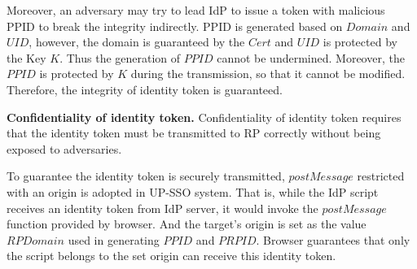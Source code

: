 Moreover, 
an adversary may try to lead IdP to issue a token with malicious PPID to break the integrity indirectly.  PPID is generated based on $Domain$ and $UID$, however, the domain is guaranteed by the $Cert$ and $UID$ is protected by the Key $K$. Thus the generation of $PPID$ cannot be undermined. Moreover, the $PPID$ is protected by $K$ during the transmission, so that it cannot be modified. Therefore, the integrity of identity token is guaranteed. 
\begin{comment}
\item An adversary may attempt to temper the $PPID$ while it is transmitted between enclave application and IdP server. However, $PPID$ is encrypted (step 17) and the key is only known to enclave application and IdP server (key exchange at step 10).
\item The adversary may also try to undermine the generation of $PPID$. 
The $PPID$ is generated based on $RPDomain$ and $UID$ (step 17). According to the description in RP designation, the $RPDomain$ must belong to the target RP. The $UID$ is retrieved according to authentication result at step 6, and encrypted.
\item The adversary may also try to steal an honest user's encrypted $PPID$ and $UID$, and set them in step 16 or step 19. However, in an honest user's device, the IdP script and enclave application are honest, so that they do not send encrypted $PPID$ and $UID$ to any malicious party. Moreover, we consider honest user's device is secure, so that the adversary cannot steal $PPID$ and $UID$ in the manners, such as intercepting communications in user's device.
\end{comment}


\vspace{1mm}\noindent\textbf{Confidentiality of identity token.}
Confidentiality of identity token requires that the identity token must be transmitted to RP correctly without being exposed to adversaries.

To guarantee the identity token is securely transmitted, $postMessage$ restricted with an origin is adopted in UP-SSO system. That is, while the IdP script receives an identity token from IdP server, it would invoke the $postMessage$ function provided by browser. And the target's origin is set as the value $RPDomain$ used in generating $PPID$ and $PRPID$. Browser guarantees that only the script belongs to the set origin can receive this identity token.

